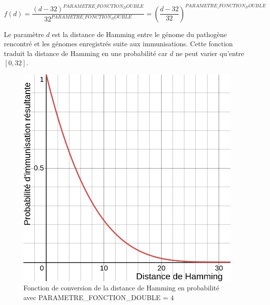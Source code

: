 $$
f(d) = \frac{(d-32)^{PARAMETRE\_FONCTION_DOUBLE}}{32^{PARAMETRE\_FONCTION_DOUBLE}} = (\frac{d-32}{32})^{PARAMETRE\_FONCTION_DOUBLE}
$$

Le paramètre $d$ est la distance de Hamming entre le génome du pathogène rencontré et les génomes enregistrés suite aux immunisations. Cette fonction traduit la distance de Hamming en une probabilité car $d$ ne peut varier qu'entre $[0,32]$.

\begin{figure}[h]
  \centering
    \captionsetup{justification=centering}
  \begin{minipage}[b]{0.4\textwidth}
    \includegraphics[width=\textwidth]{Images/doubleHamming4.png}
    \caption[Fonction (double) de converstion en probabilité (facteur 4)]{Fonction de conversion de la distance de Hamming en probabilité avec {\small PARAMETRE\_FONCTION\_DOUBLE} = $4$}
  \end{minipage}
  \hfill
  \begin{minipage}[b]{0.4\textwidth}

\end{minipage}
\end{figure}
